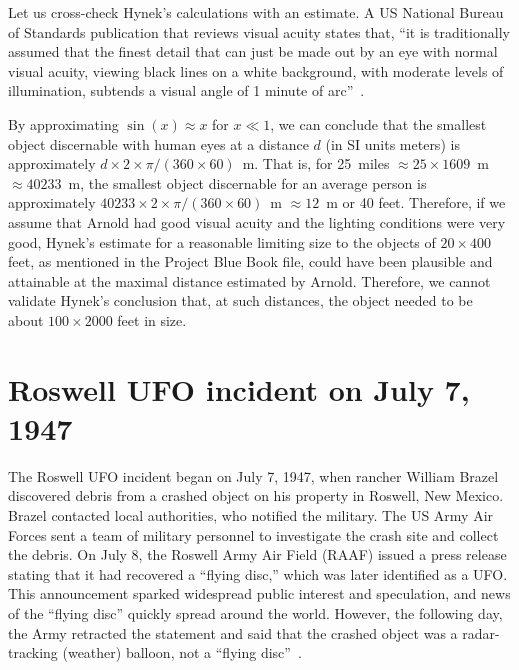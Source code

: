 Let us cross-check Hynek's calculations with an estimate. A US National Bureau of Standards publication that reviews visual acuity states that, ``it is traditionally assumed that the finest detail that can just be made out by an eye with normal visual acuity, viewing black lines on a white background, with moderate levels of illumination, subtends a visual angle of 1 minute of arc''~\cite[p.~10]{Howett1983Jul}.

By approximating $\sin(x) \approx x$ for $x\ll 1$,
we can conclude that the smallest object discernable with human eyes at a distance $d$ (in SI units meters)
is approximately $d \times 2 \times \pi /(360\times 60)$~m. That is, for 25~miles $\approx 25 \times 1609$~m $\approx 40233$~m,
the smallest object discernable for an average person is approximately $40233 \times 2 \times \pi /(360\times 60)$~m
$\approx 12$~m or 40 feet.
Therefore, if we assume that Arnold had good visual acuity and the lighting conditions were very good,
Hynek's estimate for a reasonable limiting size to the objects of $20 \times 400$ feet,
as mentioned in the Project Blue Book file, could have been plausible and attainable at the maximal distance estimated by Arnold.
Therefore, we cannot validate Hynek's conclusion that, at such distances, the object needed to be about $100 \times 2000$ feet in size.




\section{Roswell UFO incident on July 7, 1947}

\label{2023-UFO-part-History-chapter-post-1945-pre-1947-RW}

The Roswell UFO incident began on July 7, 1947, when rancher William Brazel discovered debris from a crashed object on his property in Roswell, New Mexico. Brazel contacted local authorities, who notified the military. The US Army Air Forces sent a team of military personnel to investigate the crash site and collect the debris. On July 8, the Roswell Army Air Field (RAAF) issued a press release stating that it had recovered a ``flying disc,'' which was later identified as a UFO. This announcement sparked widespread public interest and speculation, and news of the ``flying disc'' quickly spread around the world. However, the following day, the Army retracted the statement and said that the crashed object was a radar-tracking (weather) balloon, not a ``flying disc''~\cite{Davis1995}.

